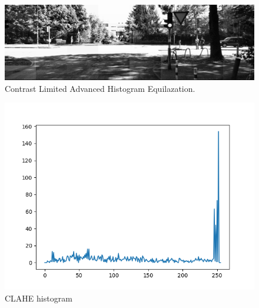 \documentclass[11pt]{article}
\begin{document}
\begin{description}
\begin{figure}[H]
  \centering
	\includegraphics[width=1\textwidth]{CLAHE}
	\caption{Contrast Limited Advanced Histogram Equilazation.} 
\end{figure}

\begin{figure}[H]
  \centering
	\includegraphics[width=1\textwidth]{Q1_b_clahe}
	\caption{CLAHE histogram} 
\end{figure}


\end{description}
\end{document}
